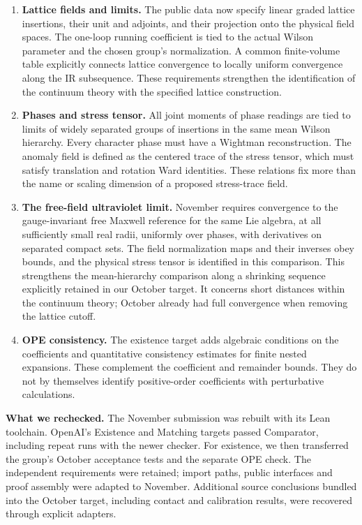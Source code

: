 \documentclass[11pt]{article}
\begin{document}
\begin{enumerate}
\item \textbf{Lattice fields and limits.}
The public data now specify linear graded lattice insertions, their unit
and adjoints, and their projection onto the physical field spaces. The
one-loop running coefficient is tied to the actual Wilson parameter and
the chosen group's normalization. A common finite-volume table explicitly
connects lattice convergence to locally uniform convergence along the IR
subsequence. These requirements strengthen the identification of the
continuum theory with the specified lattice construction.

\item \textbf{Phases and stress tensor.}
All joint moments of phase readings are tied to limits of widely separated
groups of insertions in the same mean Wilson hierarchy. Every character
phase must have a Wightman reconstruction. The anomaly field is defined
as the centered trace of the stress tensor, which must satisfy translation
and rotation Ward identities. These relations fix more than the name or
scaling dimension of a proposed stress-trace field.

\item \textbf{The free-field ultraviolet limit.}
November requires convergence to the gauge-invariant free Maxwell reference
for the same Lie algebra, at all sufficiently small real radii, uniformly
over phases, with derivatives on separated compact sets. The field
normalization maps and their inverses obey bounds, and the physical stress
tensor is identified in this comparison. This strengthens the mean-hierarchy
comparison along a shrinking sequence explicitly retained in our October
target. It concerns short distances within the continuum theory; October
already had full convergence when removing the lattice cutoff.

\item \textbf{OPE consistency.}
The existence target adds algebraic conditions on the coefficients and
quantitative consistency estimates for finite nested expansions. These
complement the coefficient and remainder bounds. They do not by themselves
identify positive-order coefficients with perturbative calculations.
\end{enumerate}

\newpage
\textbf{What we rechecked.}
The November submission was rebuilt with its Lean toolchain. OpenAI's
Existence and Matching targets passed Comparator, including repeat runs
with the newer checker. For existence, we then transferred the group's
October acceptance tests and the separate OPE check. The independent
requirements were retained; import paths, public interfaces and proof
assembly were adapted to November. Additional source conclusions bundled
into the October target, including contact and calibration results, were
recovered through explicit adapters.
\end{document}
